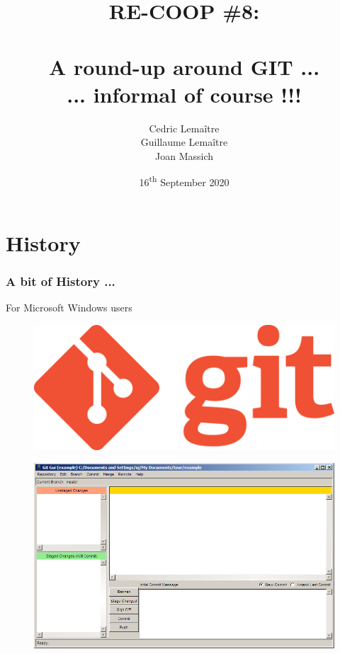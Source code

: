 \documentclass{beamer}
\title{RE-COOP \#8: \\ \  \\ {\Large A round-up around GIT ... \\ ... informal of course !!!}}
\author{Cedric Lema\^itre \\ Guillaume Lema\^itre \\ Joan Massich}
\date{16\textsuperscript{th} September 2020}
\institute{Universitat de Girona, Universit\'e de Bourgogne}
\begin{document}
\begin{frame}
  \titlepage
\end{frame}

\begin{frame}[shrink=40]
  \vspace{40px}
  \tableofcontents[sectionstyle=show,subsectionstyle=show,subsubsectionstyle=hide]
\end{frame}

\section{History}


\begin{frame}
  \frametitle{A bit of History ...}
  \begin{block}{For Microsoft Windows users}
    \begin{figure}
      \centering
      \includegraphics[width=.2\textwidth]{./images/git-logo.png}
    \end{figure}
    \begin{figure}
      \centering
      \includegraphics[width=.6\textwidth]{./images/git-windows.png}
    \end{figure}
  \end{block}
\end{frame}
\end{document}
